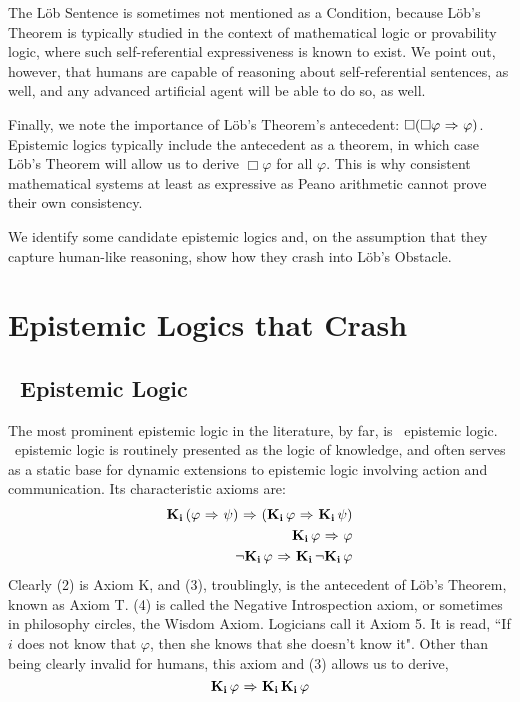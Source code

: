 The L\"ob Sentence is sometimes not mentioned as a Condition, because L\"ob's Theorem is typically studied in the context of mathematical logic or provability logic, where such self-referential expressiveness is known to exist. We point out, however, that humans are capable of reasoning about self-referential sentences, as well, and any advanced artificial agent will be able to do so, as well. 

Finally, we note the importance of L\"ob's Theorem's antecedent: $\Box(\Box\varphi {\ \Rightarrow \ } \varphi)$. Epistemic logics typically include the antecedent as a theorem, in which case L\"ob's Theorem will allow us to derive $\Box\varphi$ for all $\varphi$. This is why consistent mathematical systems at least as expressive as Peano arithmetic cannot prove their own consistency. 

We identify some candidate epistemic logics and, on the assumption that they capture human-like reasoning, show how they crash into L\"ob's Obstacle.

\section{Epistemic Logics that Crash}
\label{sec:crashing_logics}
\subsection{\SFive\ Epistemic Logic}
The most prominent epistemic logic in the literature, by far, is \SFive\ epistemic logic. \SFive\ epistemic logic is routinely presented as the logic of knowledge, and often serves as a static base for dynamic extensions to epistemic logic involving action and communication. Its characteristic axioms are:
\begin{eqnarray}
\mathbf{K}_{\mathbf{i}}\,(\varphi {\ \Rightarrow \ } \psi){\ \Rightarrow \ } (\mathbf{K}_{\mathbf{i}}\,\varphi {\ \Rightarrow \ } \mathbf{K}_{\mathbf{i}}\,\psi)\\
\mathbf{K}_{\mathbf{i}}\,\varphi {\ \Rightarrow \ } \varphi\\
{\neg}\mathbf{K}_{\mathbf{i}}\,\varphi {\ \Rightarrow \ } \mathbf{K}_{\mathbf{i}}\,{\neg}\mathbf{K}_{\mathbf{i}}\,\varphi
\end{eqnarray}
Clearly (2) is Axiom K, and (3), troublingly, is the antecedent of L\"ob's Theorem, known as Axiom T. (4) is called the Negative Introspection axiom, or sometimes in philosophy circles, the Wisdom Axiom. Logicians call it Axiom 5. It is read, ``If $i$ does not know that $\varphi$, then she knows that she doesn't know it". Other than being clearly invalid for humans, this axiom and (3) allows us to derive,
\begin{equation*}
\mathbf{K}_{\mathbf{i}}\,\varphi {\ \Rightarrow \ } \mathbf{K}_{\mathbf{i}}\,\mathbf{K}_{\mathbf{i}}\,\varphi
\end{equation*}

